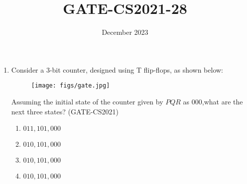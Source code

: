 \documentclass[12pt,-letter paper]{article}
\title{GATE-CS2021-28}
\author{}
\date{December 2023}
\begin{document}
\maketitle
\begin{enumerate}
\item Consider a $3$-bit counter, designed using T flip-flops, as shown below:
     \begin{figure}[H]
\centering
\texttt{[image: figs/gate.jpg]}
\caption{}
\label{fig:gate.jpg}
\end{figure}
Assuming the initial state of the counter given by $PQR$ as $000$,what are the next three states?
                 \hfill(GATE-CS2021)
\begin{enumerate}[label=(\Alph*)]
\item $011, 101, 000$
\item $010, 101, 000$
\item $010, 101, 000$
\item $010, 101, 000$
\end{enumerate}
\end{enumerate}
\end{document}
